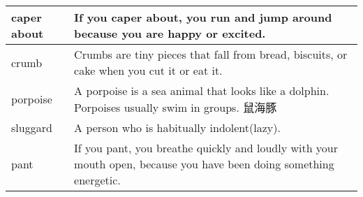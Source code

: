 \documentclass{ctexart}
\begin{document}
\begin{center}
\begin{longtable}{|l|p{7.8cm}|}
\hline
caper about
&
If you caper about, you run and jump around because you are happy or excited.
\\

\hline
crumb
&
Crumbs are tiny pieces that fall from bread, biscuits, or cake when you cut it or eat it.
\\

\hline
porpoise
&
A porpoise is a sea animal that looks like a dolphin. Porpoises usually swim in groups. 鼠海豚
\\

\hline
sluggard
&
A person who is habitually indolent(lazy).
\\

\hline
pant
&
If you pant, you breathe quickly and loudly with your mouth open, because you have been doing something energetic.
\\

\hline

\end{longtable}
\end{center}
\end{document}
